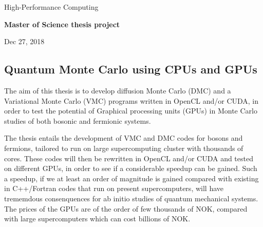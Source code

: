 \documentclass[%
oneside,                 %
final,                   %
10pt]{article}
\begin{document}

\newcommand{\exercisesection}[1]{\subsection*{#1}}






\thispagestyle{empty}

\begin{center}
{\LARGE\bf
\begin{spacing}{1.25}
High-Performance Computing 
\end{spacing}
}
\end{center}


\begin{center}
{\bf Master of Science thesis project${}^{}$} \\ [0mm]
\end{center}

\begin{center}
\end{center}
    

\begin{center}
Dec 27, 2018
\end{center}

\vspace{1cm}


\subsection*{Quantum Monte Carlo using CPUs and GPUs}

The aim of this thesis is to develop  diffusion Monte Carlo (DMC) and a Variational
Monte Carlo (VMC) programs written in OpenCL and/or CUDA, in order to test the potential
of Graphical processing units (GPUs) in Monte Carlo studies of both bosonic and fermionic systems.

The thesis entails the development of  VMC and DMC codes for bosons and fermions,
tailored to run on large supercomputing cluster with thousands of cores.
These codes will then be rewritten in OpenCL and/or CUDA and tested on different GPUs,
in order to see if a considerable speedup can be gained.
Such a speedup, if we at least an order of magnitude is gained compared 
with existing in C++/Fortran codes that run on present  supercomputers, will have trememdous consenquences for ab initio studies of quantum mechanical systems.  The prices of the GPUs are of the order of few thousands of NOK, compared
with large supercomputers which can cost billions of NOK. 
\end{document}
